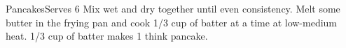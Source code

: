 \documentclass[../main.tex]{subfiles}
\begin{document}
\begin{recipe}{Pancakes}{Serves 6}{}
    Mix wet and dry together until even consistency.
    Melt some butter in the frying pan and cook 1/3
    cup of batter at a time at low-medium heat. 1/3
    cup of batter makes 1 think pancake.
    
\end{recipe}
\end{document}
